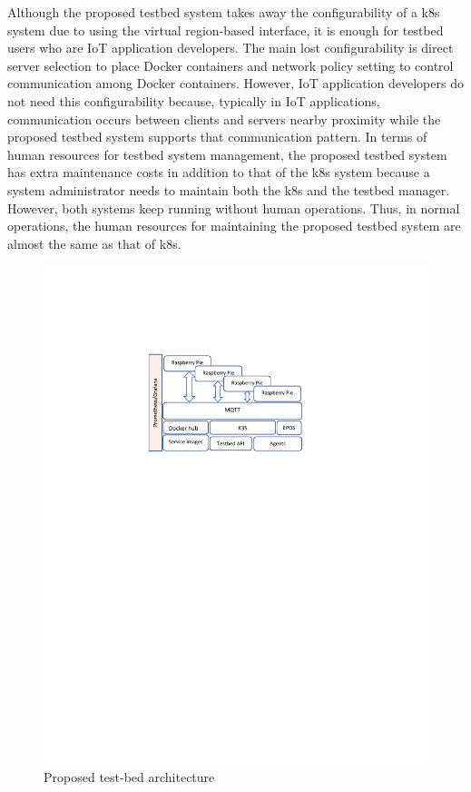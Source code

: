 \documentclass[conference]{IEEEtran}
\begin{document}
Although the proposed testbed system takes away the
configurability of a k8s system due to using the virtual
region-based interface, it is enough for testbed users who
are IoT application developers. The main lost configurability is direct server selection to place Docker containers
and network policy setting to control communication among
Docker containers. However, IoT application developers do
not need this configurability because, typically in IoT applications, communication occurs between clients and servers
nearby proximity while the proposed testbed system supports that communication pattern.
In terms of human resources for testbed system management, the proposed testbed system has extra maintenance
costs in addition to that of the k8s system because a system
administrator needs to maintain both the k8s and the testbed
manager. However, both systems keep running without human operations. Thus, in normal operations, the human resources for maintaining the proposed testbed system are almost the same as that of k8s.
\begin{figure}[!htbp]
\centering
\includegraphics[clip, trim=5.7cm 17.5cm 6.9cm 5cm, width=\columnwidth]{figures/arch2.pdf}
\caption{Proposed test-bed architecture}
\label{fig:arch}
\end{figure}
\end{document}
